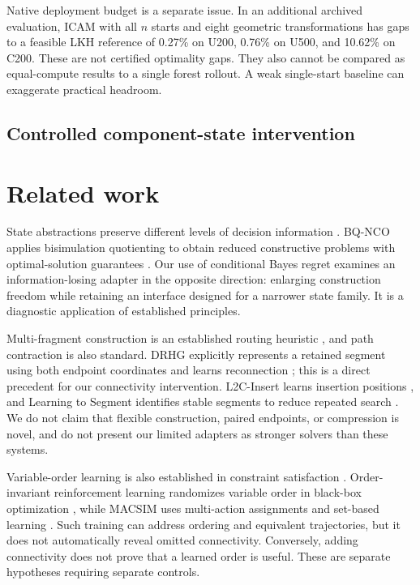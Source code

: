 \documentclass{article}
\begin{document}
Native deployment budget is a separate issue. In an additional archived
evaluation, ICAM with all $n$ starts and eight geometric transformations has
gaps to a feasible LKH reference of 0.27\% on U200, 0.76\% on U500, and
10.62\% on C200. These are not certified optimality gaps. They also cannot
be compared as equal-compute results to a single forest rollout. A weak
single-start baseline can exaggerate practical headroom.

\subsection{Controlled component-state intervention}
\label{sec:repair}


\section{Related work}
State abstractions preserve different levels of decision information
\citep{li2006abstraction}. BQ-NCO applies bisimulation quotienting to obtain
reduced constructive problems with optimal-solution guarantees
\citep{drakulic2023bqnco}. Our use of conditional Bayes regret examines an
information-losing adapter in the opposite direction: enlarging construction
freedom while retaining an interface designed for a narrower state family.
It is a diagnostic application of established principles.

Multi-fragment construction is an established routing heuristic
\citep{mamano2019multifragment}, and path contraction is also standard.
DRHG explicitly represents a retained segment using both endpoint coordinates
and learns reconnection \citep{li2025drhg}; this is a direct precedent for our
connectivity intervention. L2C-Insert learns insertion positions
\citep{luo2025insert}, and Learning to Segment identifies stable segments to
reduce repeated search \citep{ouyang2026segment}. We do not claim that flexible
construction, paired endpoints, or compression is novel, and do not present
our limited adapters as stronger solvers than these systems.

Variable-order learning is also established in constraint satisfaction
\citep{song2019ordering}. Order-invariant reinforcement learning randomizes
variable order in black-box optimization \citep{goudet2026order}, while MACSIM
uses multi-action assignments and set-based learning
\citep{luttmann2026macsim}. Such training can address ordering and equivalent
trajectories, but it does not automatically reveal omitted connectivity.
Conversely, adding connectivity does not prove that a learned order is useful.
These are separate hypotheses requiring separate controls.
\end{document}
